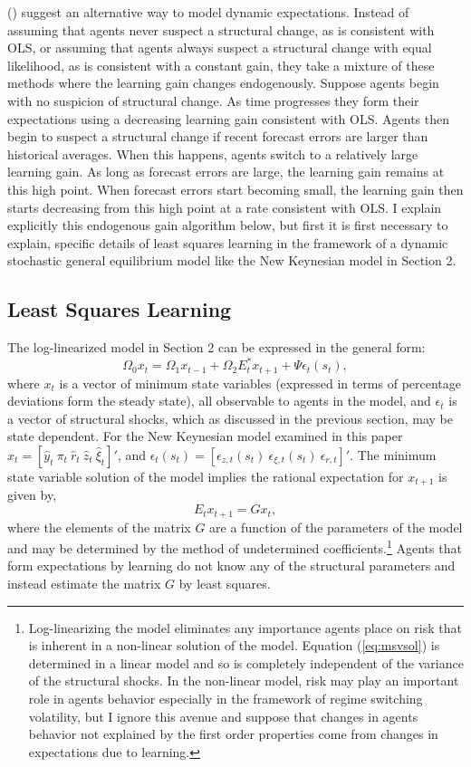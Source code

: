 \documentclass[12pt]{article}
\newcommand{\beq}{\begin{equation}}
\newcommand{\eeq}{\end{equation}}
\newcommand{\citee}[1]{\citename{#1} (\citeyear{#1})}
\newcommand{\h}[1]{\hat{#1}}
\begin{document}
\citee{marcetnicolini2003} suggest an alternative way to model dynamic expectations.  Instead of assuming that agents never suspect a structural change, as is consistent with OLS, or assuming that agents always suspect a structural change with equal likelihood, as is consistent with a constant gain, they take a mixture of these methods where the learning gain changes endogenously.  Suppose agents begin with no suspicion of structural change.  As time progresses they form their expectations using a decreasing learning gain consistent with OLS.  Agents then begin to suspect a structural change if recent forecast errors are larger than historical averages.  When this happens, agents switch to a relatively large learning gain.  As long as forecast errors are large, the learning gain remains at this high point.  When forecast errors start becoming small, the learning gain then starts decreasing from this high point at a rate consistent with OLS.  I explain explicitly this endogenous gain algorithm below, but first it is first necessary to explain, specific details of least squares learning in the framework of a dynamic stochastic general equilibrium model like the New Keynesian model in Section 2.

\subsection{Least Squares Learning}
The log-linearized model in Section 2 can be expressed in the general form:
\beq \label{eq:sform} \Omega_{0} x_t = \Omega_{1} x_{t-1} + \Omega_{2} E_t^* x_{t+1} + \Psi \epsilon_t(s_t), \eeq
where $x_t$ is a vector of minimum state variables (expressed in terms of percentage deviations form the steady state), all observable to agents in the model, and $\epsilon_t$ is a vector of structural shocks, which as discussed in the previous section, may be state dependent.  For the New Keynesian model examined in this paper $x_t = [\h{y}_t~ \pi_t~ \h{r}_t~ \h{z}_t~ \h{\xi}_t]'$, and $\epsilon_t(s_t) = [\epsilon_{z,t}(s_t)~ \epsilon_{\xi,t}(s_t)~ \epsilon_{r,t}]'$.  The minimum state variable solution of the model implies the rational expectation for $x_{t+1}$ is given by,
\beq \label{eq:msvsol} E_t x_{t+1} = G x_{t}, \eeq
where the elements of the matrix $G$ are a function of the parameters of the model and may be determined by the method of undetermined coefficients.\footnote{Log-linearizing the model eliminates any importance agents place on risk that is inherent in a non-linear solution of the model.  Equation (\ref{eq:msvsol}) is determined in a linear model and so is completely independent of the variance of the structural shocks.  In the non-linear model, risk may play an important role in agents behavior especially in the framework of regime switching volatility, but I ignore this avenue and suppose that changes in agents behavior not explained by the first order properties come from changes in expectations due to learning.}  Agents that form expectations by learning do not know any of the structural parameters and instead estimate the matrix $G$ by least squares.  
\end{document}
